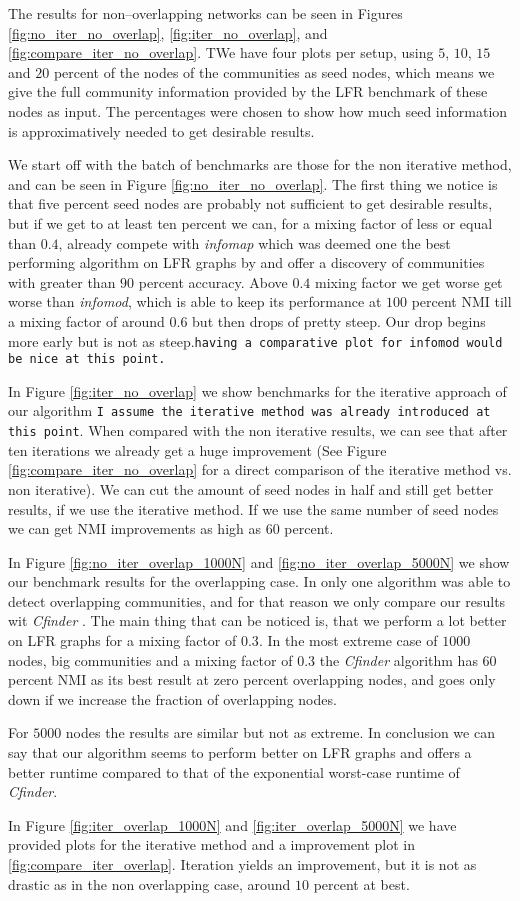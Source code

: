 The results for non--overlapping networks can be seen in Figures \ref{fig:no_iter_no_overlap}, \ref{fig:iter_no_overlap}, and \ref{fig:compare_iter_no_overlap}. TWe have four plots per setup, using $5$, $10$, $15$ and $20$ percent of the nodes of the communities as seed nodes, which means we give the full community information provided by the LFR benchmark of these nodes as input. The percentages were chosen to show how much seed information is approximatively needed to get desirable results.

We start off with the batch of benchmarks are those for the non iterative method, and can be seen in Figure \ref{fig:no_iter_no_overlap}. The first thing we notice is that five percent seed nodes are probably not sufficient to get desirable results, but if we get to at least ten percent we can, for a mixing factor of less or equal than $0.4$, already compete with \textit{infomap} which was deemed one the best performing algorithm on LFR graphs by \cite{LF09} and offer a discovery of communities with greater than $90$ percent accuracy. Above $0.4$ mixing factor we get worse get worse than \textit{infomod}, which is able to keep its performance at $100$ percent NMI till a mixing factor of around $0.6$ but then drops of pretty steep. Our drop begins more early but is not as steep.\texttt{having a comparative plot for infomod would be nice at this point.}

In Figure \ref{fig:iter_no_overlap} we show benchmarks for the iterative approach of our algorithm \texttt{I assume the iterative method was already introduced at this point}. When compared with the non iterative results, we can see that after ten iterations we already get a huge improvement (See Figure \ref{fig:compare_iter_no_overlap} for a direct comparison of the iterative method vs. non iterative). We can cut the amount of seed nodes in half and still get better results, if we use the iterative method. If we use the same number of seed nodes we can get NMI improvements as high as $60$ percent.

In Figure \ref{fig:no_iter_overlap_1000N} and \ref{fig:no_iter_overlap_5000N} we show our benchmark results for the overlapping case. In \cite{LF09} only one algorithm was able to detect overlapping communities, and for that reason we only compare our results wit \textit{Cfinder} \cite{PDFV05}. The main thing that can be noticed is, that we perform a lot better on LFR graphs for a mixing factor of $0.3$. In the most extreme case of $1000$ nodes, big communities and a mixing factor of $0.3$ the \textit{Cfinder} algorithm has $60$ percent NMI as its best result at zero percent overlapping nodes, and goes only down if we increase the fraction of overlapping nodes.

For $5000$ nodes the results are similar but not as extreme. In conclusion we can say that our algorithm seems to perform better on LFR graphs and offers a better runtime compared to that of the exponential worst-case runtime of \textit{Cfinder}.

In Figure \ref{fig:iter_overlap_1000N} and \ref{fig:iter_overlap_5000N} we have provided plots for the iterative method and a improvement plot in \ref{fig:compare_iter_overlap}. Iteration yields an improvement, but it is not as drastic as in the non overlapping case, around $10$ percent at best.